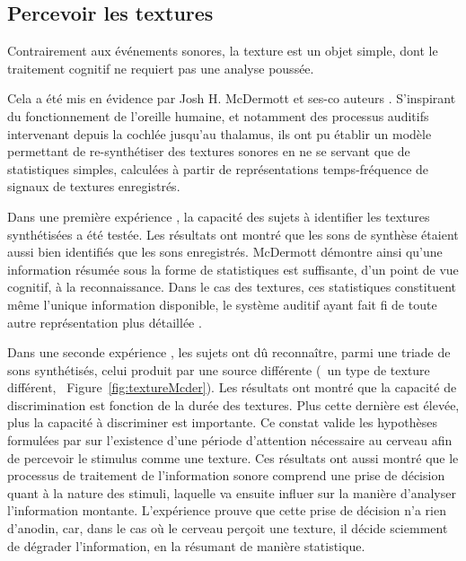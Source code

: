 \subsection{Percevoir les textures}
\label{sec:ch3_texturePerception}

Contrairement aux événements sonores, la texture est un objet simple, dont le traitement cognitif ne requiert pas une analyse poussée. 

Cela a été mis en évidence par Josh H. McDermott et ses-co auteurs \citep{mcdermott2011sound,mcdermott2013summary}. S'inspirant du fonctionnement de l'oreille humaine, et notamment des processus auditifs intervenant depuis la cochlée jusqu'au thalamus, ils ont pu établir un modèle permettant de re-synthétiser des textures sonores en ne se servant que de statistiques simples, calculées à partir de représentations temps-fréquence de signaux de textures enregistrés. 

Dans une première expérience \citep{mcdermott2011sound}, la capacité des sujets à identifier les textures synthétisées a été testée. Les résultats ont montré que les sons de synthèse étaient aussi bien identifiés que les sons enregistrés. McDermott démontre ainsi qu'une information résumée sous la forme de statistiques est suffisante, d'un point de vue cognitif, à la reconnaissance. Dans le cas des textures, ces statistiques constituent même l'unique information disponible, le système auditif ayant fait fi de toute autre représentation plus détaillée \citep{nelken2013ear}.

Dans une seconde expérience \citep{mcdermott2013summary}, les sujets ont dû reconnaître, parmi une triade de sons synthétisés, celui produit par une source différente (\ie~un type de texture différent, \cf~Figure~\ref{fig:textureMcder}). Les résultats ont montré que la capacité de discrimination est fonction de la durée des textures. Plus cette dernière est élevée, plus la capacité à discriminer est importante. Ce constat valide les hypothèses formulées par \citep{saint1995classification} sur l'existence d'une période d'attention nécessaire au cerveau afin de percevoir le stimulus comme une texture. Ces résultats ont aussi montré que le processus de traitement de l'information sonore comprend une prise de décision quant à la nature des stimuli, laquelle va ensuite influer sur la manière d'analyser l'information montante. L'expérience prouve que cette prise de décision n'a rien d'anodin, car, dans le cas où le cerveau perçoit une texture, il décide sciemment de dégrader l'information, en la résumant de manière statistique.

